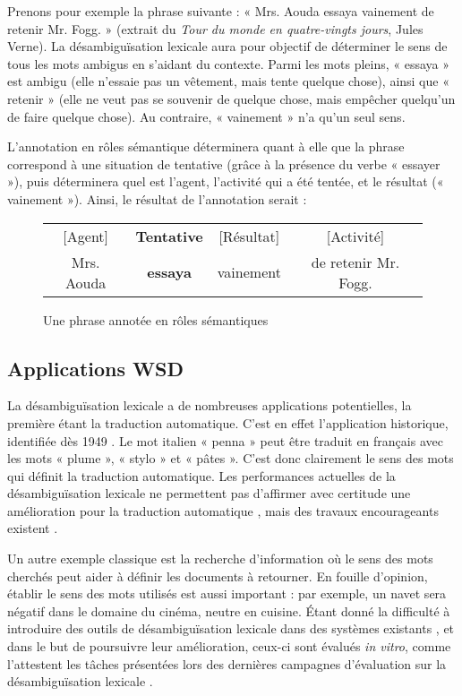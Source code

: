 Prenons pour exemple la phrase suivante : « Mrs. Aouda essaya vainement de
retenir Mr. Fogg. » (extrait du \textit{Tour du monde en quatre-vingts jours},
Jules Verne). La désambiguïsation lexicale aura pour objectif de déterminer le
sens de tous les mots ambigus en s'aidant du contexte. Parmi les mots pleins, «
essaya » est ambigu (elle n'essaie pas un vêtement, mais tente quelque chose),
ainsi que « retenir » (elle ne veut pas se souvenir de quelque chose, mais
empêcher quelqu'un de faire quelque chose). Au contraire, « vainement » n'a
qu'un seul sens.

L'annotation en rôles sémantique déterminera quant à elle que la phrase
correspond à une situation de tentative (grâce à la présence du verbe « essayer
»), puis déterminera quel est l'agent, l'activité qui a été tentée, et le
résultat (« vainement »). Ainsi, le résultat de l'annotation serait :

\begin{figure}[htbl]
    \centering
    \begin{tabular}{cccc}
      [Agent]  & \textbf{Tentative} & [Résultat]  & [Activité]           \tabularnewline
    Mrs. Aouda & \textbf{essaya}  & vainement  & de retenir Mr. Fogg. \tabularnewline
    \end{tabular}
    \caption{Une phrase annotée en rôles sémantiques}
\end{figure}

\subsection{Applications WSD}

La désambiguïsation lexicale a de nombreuses applications potentielles, la
première étant la traduction automatique. C'est en effet l'application
historique, identifiée dès 1949 \citep{weaver1949translation}. Le mot italien «
penna » peut être traduit en français avec les mots « plume », « stylo » et «
pâtes ». C'est donc clairement le sens des mots qui définit la traduction
automatique. Les performances actuelles de la désambiguïsation lexicale ne
permettent pas d'affirmer avec certitude une amélioration pour la traduction
automatique \citep{apidianaki2009place}, mais des travaux encourageants
existent \citep{chan2007word}.

Un autre exemple classique est la recherche d'information où le sens des mots
cherchés peut aider à définir les documents à retourner. En fouille d'opinion,
établir le sens des mots utilisés est aussi important : par exemple, un navet
sera négatif dans le domaine du cinéma, neutre en cuisine. Étant donné la
difficulté à introduire des outils de désambiguïsation lexicale dans des
systèmes existants \citep{navigli2009word}, et dans le but de poursuivre leur
amélioration, ceux-ci sont évalués \textit{in vitro}, comme l'attestent les
tâches présentées lors des dernières campagnes d'évaluation sur la
désambiguïsation lexicale
\citep{agirre2010semeval,manandhar2010semeval,lefever2010semeval}.


